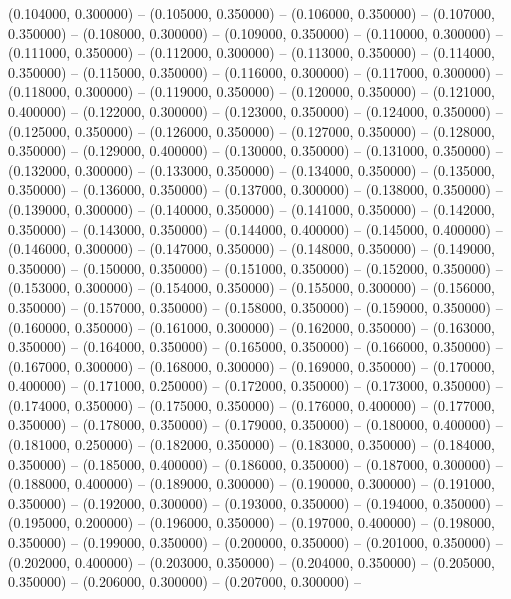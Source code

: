 (0.104000, 0.300000) -- 
(0.105000, 0.350000) -- 
(0.106000, 0.350000) -- 
(0.107000, 0.350000) -- 
(0.108000, 0.300000) -- 
(0.109000, 0.350000) -- 
(0.110000, 0.300000) -- 
(0.111000, 0.350000) -- 
(0.112000, 0.300000) -- 
(0.113000, 0.350000) -- 
(0.114000, 0.350000) -- 
(0.115000, 0.350000) -- 
(0.116000, 0.300000) -- 
(0.117000, 0.300000) -- 
(0.118000, 0.300000) -- 
(0.119000, 0.350000) -- 
(0.120000, 0.350000) -- 
(0.121000, 0.400000) -- 
(0.122000, 0.300000) -- 
(0.123000, 0.350000) -- 
(0.124000, 0.350000) -- 
(0.125000, 0.350000) -- 
(0.126000, 0.350000) -- 
(0.127000, 0.350000) -- 
(0.128000, 0.350000) -- 
(0.129000, 0.400000) -- 
(0.130000, 0.350000) -- 
(0.131000, 0.350000) -- 
(0.132000, 0.300000) -- 
(0.133000, 0.350000) -- 
(0.134000, 0.350000) -- 
(0.135000, 0.350000) -- 
(0.136000, 0.350000) -- 
(0.137000, 0.300000) -- 
(0.138000, 0.350000) -- 
(0.139000, 0.300000) -- 
(0.140000, 0.350000) -- 
(0.141000, 0.350000) -- 
(0.142000, 0.350000) -- 
(0.143000, 0.350000) -- 
(0.144000, 0.400000) -- 
(0.145000, 0.400000) -- 
(0.146000, 0.300000) -- 
(0.147000, 0.350000) -- 
(0.148000, 0.350000) -- 
(0.149000, 0.350000) -- 
(0.150000, 0.350000) -- 
(0.151000, 0.350000) -- 
(0.152000, 0.350000) -- 
(0.153000, 0.300000) -- 
(0.154000, 0.350000) -- 
(0.155000, 0.300000) -- 
(0.156000, 0.350000) -- 
(0.157000, 0.350000) -- 
(0.158000, 0.350000) -- 
(0.159000, 0.350000) -- 
(0.160000, 0.350000) -- 
(0.161000, 0.300000) -- 
(0.162000, 0.350000) -- 
(0.163000, 0.350000) -- 
(0.164000, 0.350000) -- 
(0.165000, 0.350000) -- 
(0.166000, 0.350000) -- 
(0.167000, 0.300000) -- 
(0.168000, 0.300000) -- 
(0.169000, 0.350000) -- 
(0.170000, 0.400000) -- 
(0.171000, 0.250000) -- 
(0.172000, 0.350000) -- 
(0.173000, 0.350000) -- 
(0.174000, 0.350000) -- 
(0.175000, 0.350000) -- 
(0.176000, 0.400000) -- 
(0.177000, 0.350000) -- 
(0.178000, 0.350000) -- 
(0.179000, 0.350000) -- 
(0.180000, 0.400000) -- 
(0.181000, 0.250000) -- 
(0.182000, 0.350000) -- 
(0.183000, 0.350000) -- 
(0.184000, 0.350000) -- 
(0.185000, 0.400000) -- 
(0.186000, 0.350000) -- 
(0.187000, 0.300000) -- 
(0.188000, 0.400000) -- 
(0.189000, 0.300000) -- 
(0.190000, 0.300000) -- 
(0.191000, 0.350000) -- 
(0.192000, 0.300000) -- 
(0.193000, 0.350000) -- 
(0.194000, 0.350000) -- 
(0.195000, 0.200000) -- 
(0.196000, 0.350000) -- 
(0.197000, 0.400000) -- 
(0.198000, 0.350000) -- 
(0.199000, 0.350000) -- 
(0.200000, 0.350000) -- 
(0.201000, 0.350000) -- 
(0.202000, 0.400000) -- 
(0.203000, 0.350000) -- 
(0.204000, 0.350000) -- 
(0.205000, 0.350000) -- 
(0.206000, 0.300000) -- 
(0.207000, 0.300000) -- 
